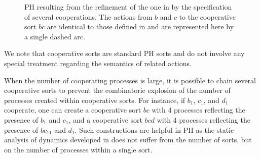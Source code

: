 \begin{figure}[p]
\centering
{}

\caption{\label{fig:runningPH-2}
PH resulting from the refinement of the one in  by the
specification of several cooperations.
The actions from $b$ and $c$ to the cooperative sort $bc$ are identical to those defined in
 and are represented here by a single dashed arc.
}
\end{figure}

We note that cooperative sorts are standard PH sorts and do not involve any
special treatment regarding the semantics of related actions.

When the number of cooperating processes is large, it is possible to chain several cooperative sorts
to prevent the combinatoric explosion of the number of processes created within cooperative sorts.
For instance, if $b_1$, $c_1$, and $d_1$ cooperate, one can create a cooperative sort $bc$ with 4
processes reflecting the presence of $b_1$ and $c_1$, and a cooperative sort $bcd$ with 4 processes
reflecting the presence of $bc_{11}$ and $d_1$.  Such constructions are helpful in PH
as the static analysis of dynamics developed in \cite{PMR12-MSCS} does not suffer from the number of
sorts, but on the number of processes within a single sort.

